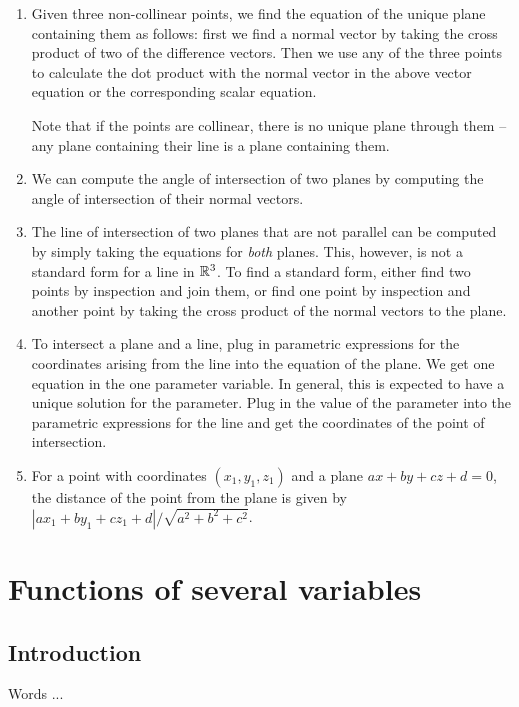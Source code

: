 \documentclass[10pt]{amsart}
\begin{document}
\begin{enumerate}
\item Given three non-collinear points, we find the equation of the
  unique plane containing them as follows: first we find a normal
  vector by taking the cross product of two of the difference
  vectors. Then we use any of the three points to calculate the dot
  product with the normal vector in the above vector equation or the
  corresponding scalar equation.

  Note that if the points are collinear, there is no unique plane
  through them -- any plane containing their line is a plane
  containing them.
\item We can compute the angle of intersection of two planes by
  computing the angle of intersection of their normal vectors.
\item The line of intersection of two planes that are not parallel can
  be computed by simply taking the equations for {\em both}
  planes. This, however, is not a standard form for a line in
  $\mathbb{R}^3$. To find a standard form, either find two points by
  inspection and join them, or find one point by inspection and
  another point by taking the cross product of the normal vectors to
  the plane.
\item To intersect a plane and a line, plug in parametric expressions
  for the coordinates arising from the line into the equation of the
  plane. We get one equation in the one parameter variable. In
  general, this is expected to have a unique solution for the
  parameter. Plug in the value of the parameter into the parametric
  expressions for the line and get the coordinates of the point of
  intersection.
\item For a point with coordinates $(x_1,y_1,z_1)$ and a plane $ax +
  by + cz + d = 0$, the distance of the point from the plane is given
  by $|ax_1 + by_1 + cz_1 + d|/\sqrt{a^2 + b^2 + c^2}$.
\end{enumerate}

\section{Functions of several variables}

\subsection{Introduction}

Words ...
\end{document}
